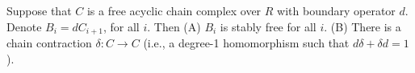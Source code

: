 Suppose that $C$ is a free acyclic chain complex over $R$ with boundary operator $d$. Denote $B_i = d C_{i+1}$, for all $i$. Then
(A) $B_i$ is stably free for all $i$.
(B) There is a chain contraction $\delta: C \rightarrow C$ (i.e., a degree-1 homomorphism such that $d\delta + \delta d = 1$).
